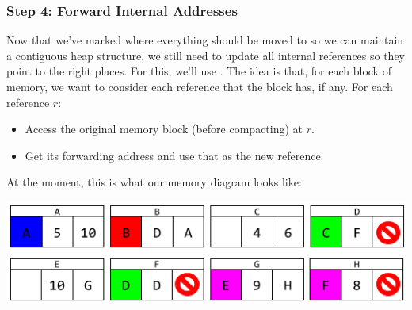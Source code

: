 \subsubsection{Step 4: Forward Internal Addresses}
\begin{mdframed}
    Now that we've marked where everything should be moved to so we can maintain a contiguous heap structure, we still need to update all internal references so they point to the right places. For this, we'll use . The idea is that, for each block of memory, we want to consider each reference that the block has, if any. For each reference $r$: 
    \begin{itemize}
        \item Access the original memory block (before compacting) at $r$.
        \item Get its forwarding address and use that as the new reference.
    \end{itemize}
\end{mdframed}
At the moment, this is what our memory diagram looks like: 
\begin{center}
    \includegraphics[scale=0.5]{assets/GCAlg4.png}
\end{center}
